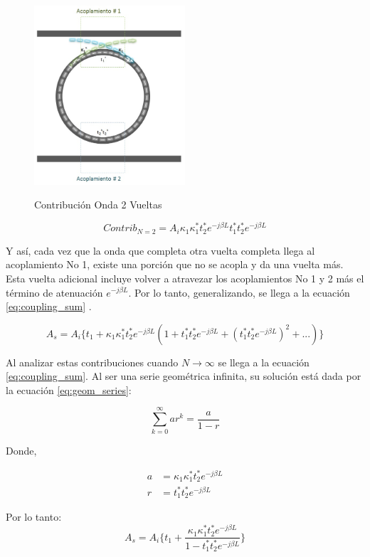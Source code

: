 \begin{figure}[h!]
\caption{Contribución Onda 2 Vueltas}
\centering
\includegraphics[width=0.5\textwidth,natwidth=562,natheight=667]{figs/rr_n2.jpg}
\label{fig:rr_n2}
\end{figure} 

\begin{equation}
Contrib_{N=2} = A_i \kappa_1 \kappa_1^* t_2^* e^{-j \beta L} t_1^* t_2^* e^{-j \beta L}
\label{eq:coupling_round_2}
\end{equation} 

Y así, cada vez que la onda que completa otra vuelta completa llega al acoplamiento No 1,
existe una porción que no se acopla y da una vuelta más. Esta vuelta adicional incluye 
volver a atravezar los acoplamientos No 1 y 2 más el término de atenuación $e^{-j \beta L}$.
Por lo tanto, generalizando, se llega a la ecuación \ref{eq:coupling_sum} \cite{yariv2006photonics}.

\begin{equation}
A_s = A_i\{
t_1+
\kappa_{1} \kappa_{1}^{*} t_{2}^{*} e^{-j \beta L} (
1 +
t_{1}^{*} t_{2}^{*} e^{-j \beta L} +
(t_{1}^{*} t_{2}^{*} e^{-j \beta L})^{2} +
...)\}
\label{eq:coupling_sum}
\end{equation}


Al analizar estas contribuciones cuando $N \to \infty$ se llega a la ecuación 
\ref{eq:coupling_sum}. Al ser una serie geométrica infinita, su solución está dada por la
ecuación \ref{eq:geom_series}:

\begin{equation}
\sum\limits_{k = 0}^\infty {ar^{k} = \frac{a}{{1 - r}}}  
\label{eq:geom_series}
\end{equation} 

Donde, 

\begin{align}
a &= \kappa_{1} \kappa_{1}^{*} t_{2}^{*} e^{-j \beta L} \\ 
r &= t_{1}^{*} t_{2}^{*} e^{-j \beta L}
\end{align} 

Por lo tanto:
\begin{equation}
A_s = A_i\{t_1 + 
\frac{ \kappa_{1} \kappa_{1}^{*} t_{2}^{*} e^{-j \beta L}}
{1 - t_{1}^{*} t_{2}^{*} e^{-j \beta L}} \}
\end{equation} 
